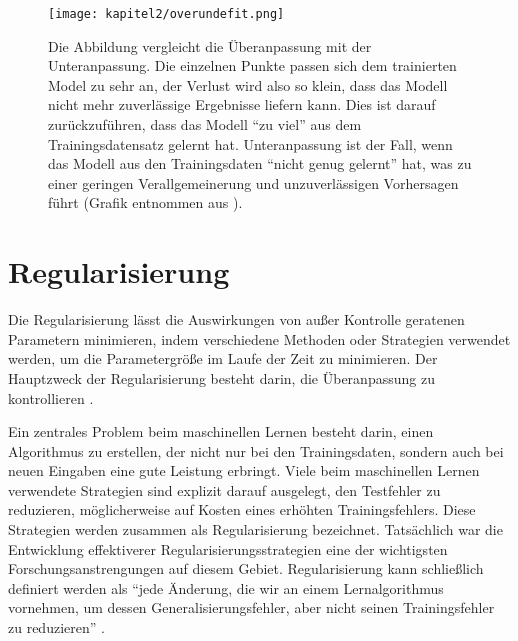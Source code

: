         \begin{figure}[H]
            \centering
            \texttt{[image: kapitel2/overundefit.png]}
            \caption[Vergleich der Unteranpassung mit der Überanpassung]{Die Abbildung vergleicht die Überanpassung mit der Unteranpassung. Die einzelnen Punkte passen sich dem trainierten Model zu sehr an, der Verlust wird also so klein, dass das Modell nicht mehr zuverlässige Ergebnisse liefern kann. Dies ist darauf zurückzuführen, dass das Modell \enquote{zu viel} aus dem Trainingsdatensatz gelernt hat. Unteranpassung ist der Fall, wenn das Modell aus den Trainingsdaten \enquote{nicht genug gelernt} hat, was zu einer geringen Verallgemeinerung und unzuverlässigen Vorhersagen führt (Grafik entnommen aus \cite*[27]{Patterson2019}). }
            \label{Kap2:OverUnder}
        \end{figure}

        \section{Regularisierung}
        Die Regularisierung lässt die Auswirkungen von außer Kontrolle geratenen Parametern minimieren, indem verschiedene Methoden oder Strategien verwendet werden, um die Parametergröße im Laufe der Zeit zu minimieren. Der Hauptzweck der Regularisierung besteht darin, die Überanpassung zu kontrollieren \cite*[79]{Patterson2019}.

        Ein zentrales Problem beim maschinellen Lernen besteht darin, einen Algorithmus zu erstellen, der nicht nur bei den Trainingsdaten, sondern auch bei neuen Eingaben eine gute Leistung erbringt. Viele beim maschinellen Lernen verwendete Strategien sind explizit darauf ausgelegt, den Testfehler zu reduzieren, möglicherweise auf Kosten eines erhöhten Trainingsfehlers. Diese Strategien werden zusammen als Regularisierung bezeichnet. Tatsächlich war die Entwicklung effektiverer Regularisierungsstrategien eine der wichtigsten Forschungsanstrengungen auf diesem Gebiet. Regularisierung kann schließlich definiert werden als \enquote{jede Änderung, die wir an einem Lernalgorithmus vornehmen, um dessen Generalisierungsfehler, aber nicht seinen Trainingsfehler zu reduzieren} \cite*[228]{IanGoodfellowYoshuaBengio2016}.

